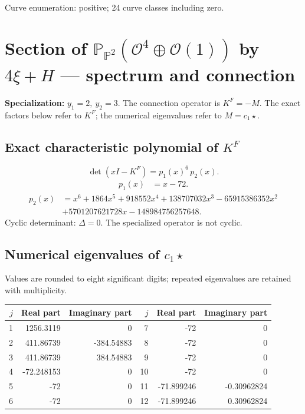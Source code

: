 \documentclass[10pt,a4paper]{article}
\begin{document}
Curve enumeration: positive; 24 curve classes including zero.
\clearpage\section*{Section of $\mathbb P_{\mathbb P^{2}}(\mathcal O^{4}\oplus \mathcal O(1))$ by $4\xi +H$ --- spectrum and connection}
\textbf{Specialization:} $y_1=2,\ y_2=3$. The connection operator is $K^F=-M$. The exact factors below refer to $K^F$; the numerical eigenvalues refer to $M=c_1\star$.
\subsection*{Exact characteristic polynomial of $K^F$}
\[\det(xI-K^F)=p_{1}(x)^{6}\,p_{2}(x).\]
\[\begin{aligned}p_{1}(x)&=x - 72.\end{aligned}\]
\[\begin{aligned}p_{2}(x)&=x^{6} + 1864 x^{5} + 918552 x^{4} + 138707032 x^{3} - 65915386352 x^{2}\\&+5701207621728 x - 148984756257648.\end{aligned}\]
Cyclic determinant: $\Delta=0$. The specialized operator is not cyclic.
\subsection*{Numerical eigenvalues of $c_1\star$}
Values are rounded to eight significant digits; repeated eigenvalues are retained with multiplicity.
\begin{center}\small\begin{tabular}{rrr@{\qquad}rrr}\toprule $j$ & Real part & Imaginary part & $j$ & Real part & Imaginary part\\\midrule
1 & 1256.3119 & 0 & 7 & -72 & 0\\
2 & 411.86739 & -384.54883 & 8 & -72 & 0\\
3 & 411.86739 & 384.54883 & 9 & -72 & 0\\
4 & -72.248153 & 0 & 10 & -72 & 0\\
5 & -72 & 0 & 11 & -71.899246 & -0.30962824\\
6 & -72 & 0 & 12 & -71.899246 & 0.30962824\\
\bottomrule\end{tabular}\end{center}
\end{document}
